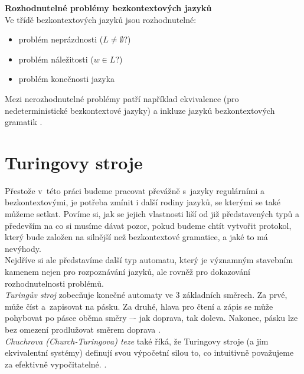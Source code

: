 \textbf{Rozhodnutelné problémy bezkontextových jazyků} \\
Ve třídě bezkontextových jazyků jsou rozhodnutelné:
\begin{itemize}
\item problém neprázdnosti ($L \neq \emptyset$?)
\item problém náležitosti ($w \in L$?)
\item problém konečnosti jazyka \cite[str. 97-98]{TIN2013}
\end{itemize}
\vspace*{\baselineskip}
Mezi nerozhodnutelné problémy patří například ekvivalence (pro nedeterministické bezkontextové jazyky) a inkluze jazyků bezkontextových gramatik 
\cite[str. 98]{TIN2013}.

\section{Turingovy stroje} \label{sec:2:ts}
Přestože v~této práci budeme pracovat převážně s~jazyky regulárními a bezkontextovými, je potřeba zmínit i další rodiny jazyků, se kterými se také 
můžeme setkat. Povíme si, jak se jejich vlastnosti liší od již představených typů a především na co si musíme dávat pozor, pokud budeme chtít 
vytvořit protokol, který bude založen na silnější než bezkontextové gramatice, a jaké to má nevýhody. \\

Nejdříve si ale představíme další typ automatu, který je významným stavebním kamenem nejen pro rozpoznávání jazyků, ale rovněž pro dokazování 
rozhodnutelnosti problémů. \\

\textit{Turingův stroj} zobecňuje konečné automaty ve 3 základních směrech. Za prvé, může číst a~zapisovat na pásku. Za druhé, hlava pro čtení 
a zápis se může pohybovat po pásce oběma směry –- jak doprava, tak doleva. Nakonec, pásku lze bez omezení prodlužovat směrem doprava 
\cite[str. 199]{Meduna2014}. \\

\textit{Chuchrova (Church-Turingova) teze} také říká, že Turingovy stroje (a jim ekvivalentní systémy) definují svou výpočetní silou to, co intuitivně 
považujeme za efektivně vypočitatelné. \cite[str. 102]{TIN2013}. \\

